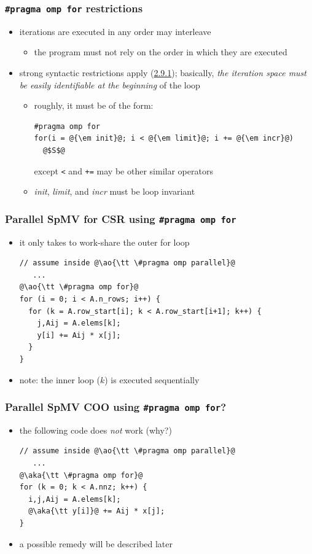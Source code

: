 \documentclass[12pt,dvipdfmx]{beamer}
\newcommand{\sectionompforform}{{\href{https://www.openmp.org/spec-html/5.0/openmpsu40.html\#x63-1260002.9.1}{2.9.1}}}
\newcommand{\ao}[1]{{\color{blue}#1}}
\newcommand{\aka}[1]{{\color{red}#1}}
\begin{document}
\begin{frame}[fragile]
\frametitle{{\tt \#pragma omp for} restrictions}
\begin{itemize}
\item iterations are executed in any order may interleave
  \begin{itemize}
  \item the program must not rely on the order in which they are executed
  \end{itemize}
\item strong syntactic restrictions apply (\sectionompforform); basically,
\ao{\em the iteration space must be easily 
  identifiable at the beginning\/} of the loop
\begin{itemize}
\item roughly, it must be of the form:
\begin{lstlisting}
#pragma omp for
for(i = @{\em init}@; i < @{\em limit}@; i += @{\em incr}@) 
  @$S$@
\end{lstlisting}
except {\tt <} and {\tt +=} may be other similar operators
\item {\em init}, {\em limit}, and {\em incr} must be loop invariant
\end{itemize}
\end{itemize}
\end{frame}

\begin{frame}[fragile]
\frametitle{Parallel SpMV for CSR using {\tt \#pragma omp for}}
\begin{itemize}
\item it only takes to work-share the outer for loop
\begin{lstlisting}
// assume inside @\ao{\tt \#pragma omp parallel}@
   ...
@\ao{\tt \#pragma omp for}@
for (i = 0; i < A.n_rows; i++) {
  for (k = A.row_start[i]; k < A.row_start[i+1]; k++) {
    j,Aij = A.elems[k];
    y[i] += Aij * x[j];
  }
}
\end{lstlisting}

\item note: the inner loop ($k$) is executed sequentially
\end{itemize}
\end{frame}


\begin{frame}[fragile]
  \frametitle{Parallel SpMV COO using {\tt \#pragma omp for}?}
  \begin{itemize}
  \item the following code does {\it not} work (why?)
\begin{lstlisting}
// assume inside @\ao{\tt \#pragma omp parallel}@
   ...
@\aka{\tt \#pragma omp for}@
for (k = 0; k < A.nnz; k++) {
  i,j,Aij = A.elems[k];
  @\aka{\tt y[i]}@ += Aij * x[j];
}
\end{lstlisting}

\item a possible remedy will be described later
  \end{itemize}
\end{frame}
\end{document}
